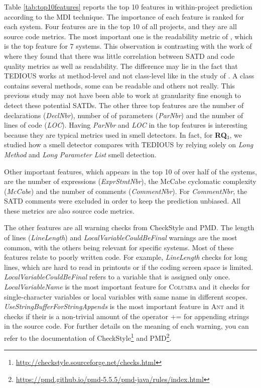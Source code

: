 Table \ref{tab:top10features} reports the top 10 features in within-project prediction according to the MDI technique. The importance of each feature is ranked for each system. Four features are in the top 10 of all projects, and they are all source code metrics. The most important one is the readability metric of \citet{buse2008metric}, which is the top feature for 7 systems. This observation is contrasting with the work of \citet{BavotaR16} where they found that there was little correlation between SATD and code quality metrics as well as readability. The difference may lie in the fact that TEDIOUS works at method-level and not class-level like in the study of \citet{BavotaR16}. A class contains several methods, some can be readable and others not really. This previous study may not have been able to work at granularity fine enough to detect these potential SATDs. The other three top features are the number of declarations (\textit{DeclNbr}), number of of parameters (\textit{ParNbr}) and the number of lines of code (\textit{LOC}). Having \textit{ParNbr} and \textit{LOC} in the top features is interesting because they are typical metrics used in smell detectors. In fact, for \textbf{RQ$_3$}, we studied how a smell detector compares with TEDIOUS by relying solely on \textit{Long Method} and \textit{Long Parameter List} smell detection.
	
Other important features, which appears in the top 10 of over half of the systems, are the number of expressions (\textit{ExprStmtNbr}), the McCabe cyclomatic complexity (\textit{McCabe}) and the number of comments (\textit{CommentNbr}). For \textit{CommentNbr}, the SATD comments were excluded in order to keep the prediction unbiased. All these metrics are also source code metrics.

The other features are all warning checks from CheckStyle and PMD. The length of lines (\textit{LineLength}) and \textit{LocalVariableCouldBeFinal} warnings are the most common, with the others being relevant for specific systems. Most of these features relate to poorly written code. For example, \textit{LineLength} checks for long lines, which are hard to read in printouts or if the coding screen space is limited. \textit{LocalVariableCouldBeFinal} refers to a variable that is assigned only once. \textit{LocalVariableName} is the most important feature for \textsc{Columba} and it checks for single-character variables or local variables with same name in different scopes. \textit{UseStringBufferForStringAppends} is the most important feature in \textsc{Ant} and it checks if their is a non-trivial amount of the operator \textsc{+=} for appending strings in the source code. For further details on the meaning of each warning, you can refer to the documentation of CheckStyle\footnote{\url{http://checkstyle.sourceforge.net/checks.html}} and PMD\footnote{\url{https://pmd.github.io/pmd-5.5.5/pmd-java/rules/index.html}}.

